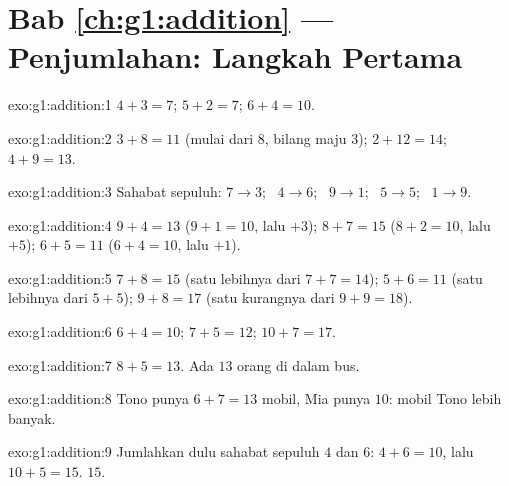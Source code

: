 \section*{Bab \ref{ch:g1:addition} --- Penjumlahan: Langkah Pertama}

\begin{solution}{exo:g1:addition:1}
$4 + 3 = 7$; \quad $5 + 2 = 7$; \quad $6 + 4 = 10$.
\end{solution}

\begin{solution}{exo:g1:addition:2}
$3 + 8 = 11$ (mulai dari $8$, bilang maju $3$); \quad
$2 + 12 = 14$; \quad $4 + 9 = 13$.
\end{solution}

\begin{solution}{exo:g1:addition:3}
Sahabat sepuluh: $7 \to 3$; \ $4 \to 6$; \ $9 \to 1$; \ $5 \to 5$;
\ $1 \to 9$.
\end{solution}

\begin{solution}{exo:g1:addition:4}
$9 + 4 = 13$ ($9 + 1 = 10$, lalu $+3$); \quad
$8 + 7 = 15$ ($8 + 2 = 10$, lalu $+5$); \quad
$6 + 5 = 11$ ($6 + 4 = 10$, lalu $+1$).
\end{solution}

\begin{solution}{exo:g1:addition:5}
$7 + 8 = 15$ (satu lebihnya dari $7 + 7 = 14$); \quad
$5 + 6 = 11$ (satu lebihnya dari $5 + 5$); \quad
$9 + 8 = 17$ (satu kurangnya dari $9 + 9 = 18$).
\end{solution}

\begin{solution}{exo:g1:addition:6}
$6 + 4 = 10$; \quad $7 + 5 = 12$; \quad $10 + 7 = 17$.
\end{solution}

\begin{solution}{exo:g1:addition:7}
$8 + 5 = 13$. Ada $13$ orang di dalam bus.
\end{solution}

\begin{solution}{exo:g1:addition:8}
Tono punya $6 + 7 = 13$ mobil, Mia punya $10$: mobil Tono lebih banyak.
\end{solution}

\begin{solution}{exo:g1:addition:9}
Jumlahkan dulu sahabat sepuluh $4$ dan $6$: $4 + 6 = 10$, lalu
$10 + 5 = 15$.  $15$.

\end{solution}

